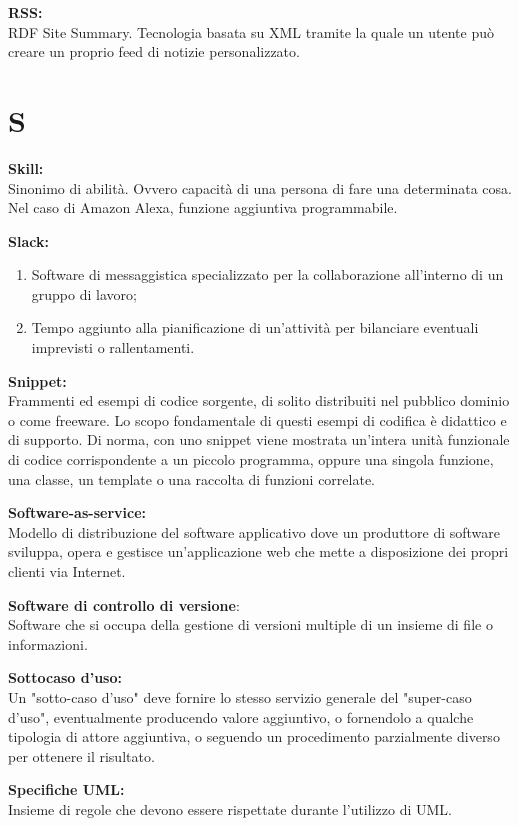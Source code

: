 \documentclass[a4paper, oneside, openany, dvipsnames, table]{article}
\begin{document}
\textbf{RSS:}\\	RDF Site Summary. Tecnologia basata su XML tramite la quale un utente può creare un proprio feed di notizie personalizzato.
\newpage
\section{S}
\textbf{Skill:}\\	Sinonimo di abilità. Ovvero capacità di una persona di fare una determinata cosa. Nel caso di Amazon Alexa, funzione aggiuntiva programmabile.

\textbf{Slack:}
\begin{enumerate}
	\item Software di messaggistica specializzato per la collaborazione all'interno di un gruppo di lavoro;
	\item Tempo aggiunto alla pianificazione di un'attività per bilanciare eventuali imprevisti o rallentamenti.
\end{enumerate} 

\textbf{Snippet:}\\	Frammenti ed esempi di codice sorgente, di solito distribuiti nel 
pubblico dominio o come freeware. Lo scopo fondamentale di questi esempi di codifica è 
didattico e di supporto. Di norma, con uno snippet viene mostrata un'intera unità funzionale 
di codice corrispondente a un piccolo programma, oppure una singola funzione, una classe, 
un template o una raccolta di funzioni correlate.

\textbf{Software-as-service:}\\	Modello di distribuzione del software applicativo dove un produttore di software sviluppa, opera e gestisce un'applicazione web che mette a disposizione dei propri clienti via Internet.

\textbf{Software di controllo di versione}:\\ Software che si occupa della  gestione di versioni multiple di un insieme di file o informazioni.

\textbf{Sottocaso d'uso:}\\
Un "sotto-caso d'uso" deve fornire lo stesso servizio generale del "super-caso d'uso", eventualmente producendo valore aggiuntivo, o fornendolo a qualche tipologia di attore aggiuntiva, o seguendo un procedimento parzialmente diverso per ottenere il risultato.

\textbf{Specifiche UML:}\\	
Insieme di regole che devono essere rispettate durante l'utilizzo di UML.
\end{document}
